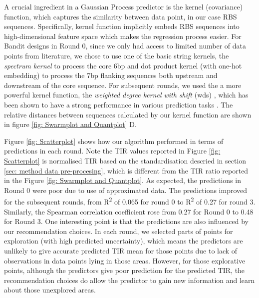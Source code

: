 \documentclass{article}
\begin{document}
A crucial ingredient in a Gaussian Process predictor \cite{Rasmussen2004} is the kernel (covariance) function, which captures the similarity between data point, in our case RBS sequences.
Specifically, kernel function implicitly embeds RBS sequences into high-dimensional feature space which makes the regression process easier.
For Bandit designs in Round 0, since we only had access to limited number of data points from literature, we chose to use one of the basic string kernels, the \textit{spectrum kernel} \cite{leslie2001spectrum} to process the core 6bp and dot product kernel \cite{Rasmussen2004} (with one-hot embedding) to process the 7bp flanking sequences both upstream and downstream of the core sequence.
For subsequent rounds, we used the a more powerful kernel function, the \textit{weighted degree kernel with shift} (wds) \cite{ratsch_rase_2005_wds}, which has been shown to have a strong performance in various prediction tasks \cite{Ben-Hur2008}.
The relative distances between sequences calculated by our kernel function are shown in figure \ref{fig: Swarmplot and Quantplot} D.

Figure \ref{fig: Scatterplot} shows how our algorithm performed in terms of predictions in each round. 
Note the TIR values reported in Figure \ref{fig: Scatterplot} is normalised TIR based on the standardisation descried in section \ref{sec: method data pre-procesing}, which is different from the TIR ratio reported in the Figure \ref{fig: Swarmplot and Quantplot}.
As expected, the predictions in Round 0 were poor due to use of approximated data. 
The predictions improved for the subsequent rounds, from R\textsuperscript{2} of 0.065 for round 0 to R\textsuperscript{2} of 0.27 for round 3.
Similarly, the Spearman correlation coefficient rose from 0.27 for Round 0 to 0.48 for Round 3.
One interesting point is that the predictions are also influenced by our recommendation choices. 
In each round, we selected parts of points for exploration (with high predicted uncertainty), which means the predictors are unlikely to give accurate predicted TIR mean for those points due to lack of observations in data points lying in those areas. 
However, for those explorative points, although the predictors give poor prediction for the predicted TIR, the recommendation choices do allow the predictor to gain new information and learn about those unexplored areas. 
\end{document}
